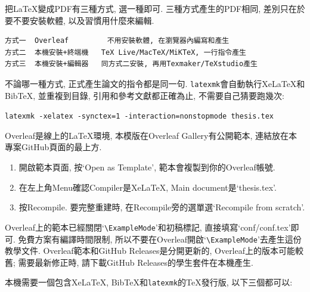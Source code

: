
把LaTeX變成PDF有三種方式, 選一種即可. 三種方式產生的PDF相同, 差別只在於要不要安裝軟體, 以及習慣用什麼來編輯.

\begin{DescriptionFrame}
\begin{verbatim}
方式一  Overleaf         不用安裝軟體, 在瀏覽器內編寫和產生
方式二  本機安裝+終端機   TeX Live/MacTeX/MiKTeX, 一行指令產生
方式三  本機安裝+編輯器   同方式二安裝, 再用Texmaker/TeXstudio產生
\end{verbatim}
\end{DescriptionFrame}

不論哪一種方式, 正式產生論文的指令都是同一句. \texttt{latexmk}會自動執行XeLaTeX和BibTeX, 並重複到目錄, 引用和參考文獻都正確為止, 不需要自己猜要跑幾次:

\begin{center}
\verb|latexmk -xelatex -synctex=1 -interaction=nonstopmode thesis.tex|
\end{center}


Overleaf是線上的LaTeX環境, 本模版在Overleaf Gallery有公開範本, 連結放在本專案GitHub頁面的最上方.

\begin{enumerate}
  \item 開啟範本頁面, 按`Open as Template', 範本會複製到你的Overleaf帳號.
  \item 在左上角Menu確認Compiler是XeLaTeX, Main document是`thesis.tex'.
  \item 按Recompile. 要完整重建時, 在Recompile旁的選單選`Recompile from scratch'.
\end{enumerate}

Overleaf上的範本已經關閉`\verb|\ExampleMode|'和初稿標記, 直接填寫`conf/conf.tex'即可. 免費方案有編譯時間限制, 所以不要在Overleaf開啟`\verb|\ExampleMode|'去產生這份教學文件. Overleaf範本和GitHub Releases是分開更新的, Overleaf上的版本可能較舊; 需要最新修正時, 請下載GitHub Releases的學生套件在本機產生.


本機需要一個包含XeLaTeX, BibTeX和\texttt{latexmk}的TeX發行版, 以下三個都可以:

